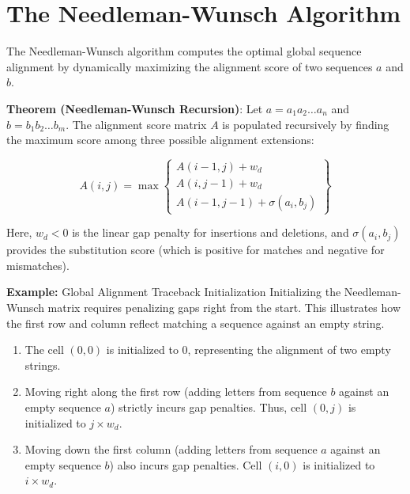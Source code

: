 \section{The Needleman-Wunsch Algorithm}

The Needleman-Wunsch algorithm computes the optimal global sequence alignment by dynamically maximizing the alignment score of two sequences $a$ and $b$.

\begin{important}
    \textbf{Theorem (Needleman-Wunsch Recursion)}: 
    Let $a = a_1a_2\dots a_n$ and $b = b_1b_2\dots b_m$. The alignment score matrix $A$ is populated recursively by finding the maximum score among three possible alignment extensions:
    
    \begin{equation}
    A(i, j) = \max \left\{ 
        \begin{array}{l} 
        A(i-1, j) + w_d \\ 
        A(i, j-1) + w_d \\ 
        A(i-1, j-1) + \sigma(a_i, b_j) 
        \end{array} 
    \right\}
    \label{eq:needleman}
    \end{equation}
\end{important}

Here, $w_d < 0$ is the linear gap penalty for insertions and deletions, and $\sigma(a_i, b_j)$ provides the substitution score (which is positive for matches and negative for mismatches). 

\textbf{Example:} Global Alignment Traceback Initialization
Initializing the Needleman-Wunsch matrix requires penalizing gaps right from the start.
This illustrates how the first row and column reflect matching a sequence against an empty string.
\begin{enumerate}
    \item The cell $(0,0)$ is initialized to $0$, representing the alignment of two empty strings.
    \item Moving right along the first row (adding letters from sequence $b$ against an empty sequence $a$) strictly incurs gap penalties. Thus, cell $(0, j)$ is initialized to $j \times w_d$.
    \item Moving down the first column (adding letters from sequence $a$ against an empty sequence $b$) also incurs gap penalties. Cell $(i, 0)$ is initialized to $i \times w_d$.
\end{enumerate}

